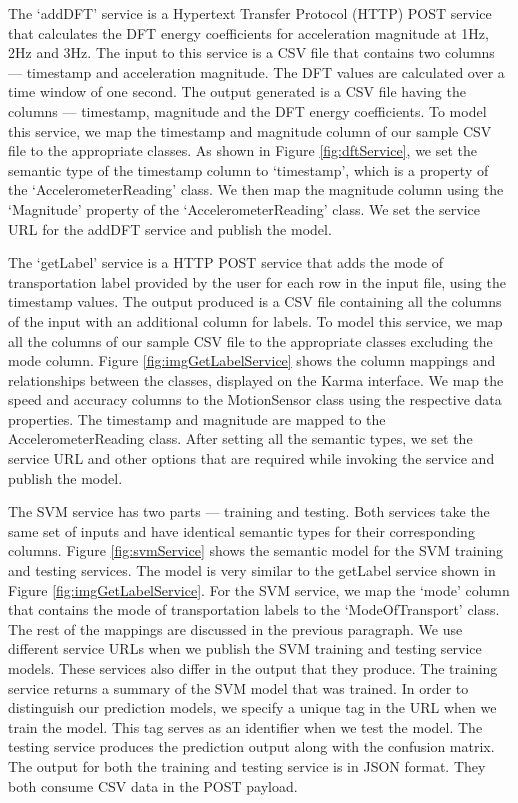 The `addDFT' service is a Hypertext Transfer Protocol (HTTP) POST service that calculates the DFT energy coefficients for acceleration magnitude at 1Hz, 2Hz and 3Hz. The input to this service is a CSV file that contains two columns --- timestamp and acceleration magnitude. The DFT values are calculated over a time window of one second. The output generated is a CSV file having the columns --- timestamp, magnitude and the DFT energy coefficients. To model this service, we map the timestamp and magnitude column of our sample CSV file to the appropriate classes. As shown in Figure \ref{fig:dftService}, we set the semantic type of the timestamp column to `timestamp', which is a property of the `AccelerometerReading' class. We then map the magnitude column using the `Magnitude' property of the `AccelerometerReading' class. We set the service URL for the addDFT service and publish the model.

The `getLabel' service is a HTTP POST service that adds the mode of transportation label provided by the user for each row in the input file, using the timestamp values. The output produced is a CSV file containing all the columns of the input with an additional column for labels. To model this service, we map all the columns of our sample CSV file to the appropriate classes excluding the mode column. Figure \ref{fig:imgGetLabelService} shows the column mappings and relationships between the classes, displayed on the Karma interface. We map the speed and accuracy columns to the MotionSensor class using the respective data properties. The timestamp and magnitude are mapped to the AccelerometerReading class. After setting all the semantic types, we set the service URL and other options that are required while invoking the service and publish the model. 

The SVM service has two parts --- training and testing. Both  services take the same set of inputs and have identical semantic types for their corresponding columns. Figure \ref{fig:svmService} shows the semantic model for the SVM training and testing services. The model is very similar to the getLabel service shown in  Figure \ref{fig:imgGetLabelService}. For the SVM service, we map the `mode' column that contains the mode of transportation labels to the `ModeOfTransport' class. The rest of the mappings are discussed in the previous paragraph. We use different service URLs when we publish the SVM training and testing service models. These services also differ in the output that they produce. The training service returns a summary of the SVM model that was trained. In order to distinguish our prediction models, we specify a unique tag in the URL when we train the model. This tag serves as an identifier when we test the model. The testing service produces the prediction output along with the confusion matrix. The output for both the training and testing service is in JSON format. They both consume CSV data in the POST payload.

